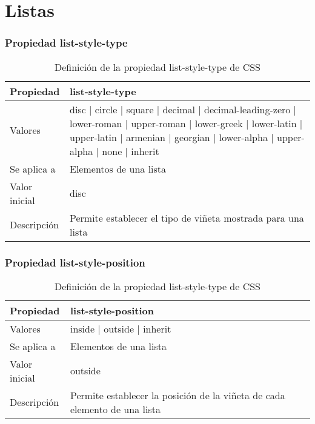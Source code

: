 
\section{Listas}

\begin{frame}
\frametitle{Propiedad list-style-type}

\begin{center}
  \begin{table}
   \begin{tabular}{p{1.8cm}p{7.8cm}}
Propiedad & \bf{list-style-type} \\ \hline
Valores& disc | circle | square | decimal | decimal-leading-zero | lower-roman | upper-roman | lower-greek | lower-latin | upper-latin | armenian | georgian | lower-alpha | upper-alpha | none | inherit \\ \hline
Se aplica a& Elementos de una lista \\ \hline
Valor inicial& disc \\ \hline
Descripción& Permite establecer el tipo de viñeta mostrada para una lista \\ \hline
  \end{tabular}
   \caption{Definición de la propiedad list-style-type de CSS}
 \end{table}
\end{center}


\end{frame}



\begin{frame}
\frametitle{Propiedad list-style-position}

\begin{center}
  \begin{table}
   \begin{tabular}{p{1.8cm}p{7.8cm}}
Propiedad & \bf{list-style-position} \\ \hline
Valores& inside | outside | inherit \\ \hline
Se aplica a& Elementos de una lista \\ \hline
Valor inicial& outside \\ \hline
Descripción& Permite establecer la posición de la viñeta de cada elemento de una lista \\ \hline
  \end{tabular}
   \caption{Definición de la propiedad list-style-type de CSS}
 \end{table}
\end{center}


\end{frame}


